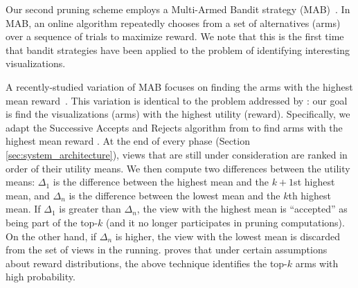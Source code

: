 \label{sec:multi_armed_bandit}
Our second pruning scheme employs a Multi-Armed Bandit strategy (MAB)~.
In MAB, an online algorithm repeatedly chooses from a set of alternatives (arms)
over a sequence of trials to maximize reward. 
We note that this is the first time that bandit strategies have been
applied to the problem of identifying interesting visualizations.

A recently-studied variation of MAB focuses on finding the arms with the highest
mean reward~\cite{BubeckWV13, audibert2010best}.
This variation is identical to the problem addressed by \SeeDB: our goal is 
find the visualizations (arms) with the  highest utility (reward).
Specifically, we adapt the Successive Accepts and Rejects algorithm from \cite{BubeckWV13} 
to find arms with the highest mean reward
. 
At the end of every phase (Section \ref{sec:system_architecture}), 
views that are still under consideration 
are ranked in order of their utility means. 
We then compute two  differences between the utility means: $\Delta_1$
is the difference between the highest mean and the $k+1$st highest mean, and
$\Delta_n$ is the difference between the lowest mean and the $k$th highest mean.
If $\Delta_1$ is greater than $\Delta_n$, the view with the highest mean is
``accepted'' as being part of the top-$k$ (and it no longer participates
in pruning computations).
On the other hand, if $\Delta_n$ is higher, the view with the lowest mean is discarded
from the set of views in the running.
\cite{BubeckWV13} proves that under certain assumptions about reward distributions,
the above technique identifies the top-$k$ arms with high probability.


